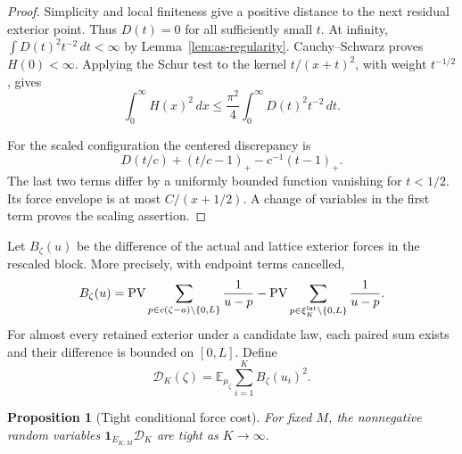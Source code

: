 \documentclass[11pt,reqno]{amsart}
\numberwithin{equation}{section}
\newtheorem{proposition}[theorem]{Proposition}
\theoremstyle{definition}
\theoremstyle{remark}
\newcommand{\E}{\mathbb E}
\newcommand{\1}{\mathbf 1}
\newcommand{\PV}{\operatorname{PV}}
\newcommand{\dd}{\,d}
\begin{document}
\begin{proof}
Simplicity and local finiteness give a positive distance to the next
residual exterior point. Thus $D(t)=0$ for all sufficiently small $t$.
At infinity,
$\int D(t)^2t^{-2}\dd t<\infty$ by
Lemma~\ref{lem:as-regularity}. Cauchy--Schwarz proves $H(0)<\infty$.
Applying the Schur test to the kernel $t/(x+t)^2$, with weight
$t^{-1/2}$, gives
\begin{equation}\label{eq:hardy}
\int_0^\infty H(x)^2\dd x
\le\frac{\pi^2}{4}\int_0^\infty D(t)^2t^{-2}\dd t.
\end{equation}

For the scaled configuration the centered discrepancy is
\[
D(t/c)+(t/c-1)_+-c^{-1}(t-1)_+.
\]
The last two terms differ by a uniformly bounded function vanishing
for $t<1/2$. Its force envelope is at most $C/(x+1/2)$.
A change of variables in the first term proves the scaling assertion.
\end{proof}

Let $B_\zeta(u)$ be the difference of the actual and lattice exterior
forces in the rescaled block. More precisely, with endpoint terms
cancelled,
\[
B_\zeta(u)=\PV\sum_{p\in c(\zeta-a)\setminus\{0,L\}}\frac1{u-p}
-\PV\sum_{p\in\xi_K^{\rm lat}\setminus\{0,L\}}\frac1{u-p}.
\]
For almost every retained exterior under a candidate law, each paired
sum exists and their difference is bounded on $[0,L]$. Define
\begin{equation}\label{eq:Dcost}
\mathcal D_K(\zeta)=
\E_{\mu_\zeta}\sum_{i=1}^K B_\zeta(u_i)^2.
\end{equation}

\begin{proposition}[Tight conditional force cost]\label{prop:force}
For fixed $M$, the nonnegative random variables
$\1_{E_{K,M}}\mathcal D_K$ are tight as $K\to\infty$.
\end{proposition}
\end{document}
